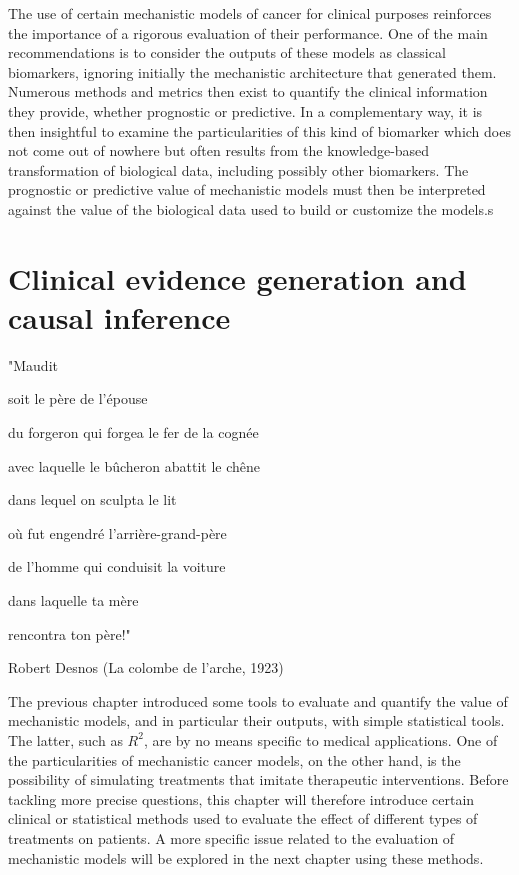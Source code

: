 \documentclass[a4paper,12pt,twoside,onecolumn,openright,final,oldfontcommands]{memoir}
\newcommand{\initial}[1]{
	\lettrine[lines=3,lhang=0.33,nindent=0em]{
		\color{gray}
     		{\textsc{#1}}}{}}
\begin{document}
The use of certain mechanistic models of cancer for clinical purposes
reinforces the importance of a rigorous evaluation of their performance.
One of the main recommendations is to consider the outputs of these
models as classical biomarkers, ignoring initially the mechanistic
architecture that generated them. Numerous methods and metrics then
exist to quantify the clinical information they provide, whether
prognostic or predictive. In a complementary way, it is then insightful
to examine the particularities of this kind of biomarker which does not
come out of nowhere but often results from the knowledge-based
transformation of biological data, including possibly other biomarkers.
The prognostic or predictive value of mechanistic models must then be
interpreted against the value of the biological data used to build or
customize the models.s

\chapter{Clinical evidence generation and causal
inference}\label{causal-chap}

\epigraph{"Maudit

soit le père de l'épouse

du forgeron qui forgea le fer de la cognée

avec laquelle le bûcheron abattit le chêne

dans lequel on sculpta le lit

où fut engendré l'arrière-grand-père

de l'homme qui conduisit la voiture

dans laquelle ta mère

rencontra ton père!"}{Robert Desnos (La colombe de l'arche, 1923)}

\initial{T}he previous chapter introduced some tools to evaluate and
quantify the value of mechanistic models, and in particular their
outputs, with simple statistical tools. The latter, such as \(R^2\), are
by no means specific to medical applications. One of the particularities
of mechanistic cancer models, on the other hand, is the possibility of
simulating treatments that imitate therapeutic interventions. Before
tackling more precise questions, this chapter will therefore introduce
certain clinical or statistical methods used to evaluate the effect of
different types of treatments on patients. A more specific issue related
to the evaluation of mechanistic models will be explored in the next
chapter using these methods.
\end{document}
